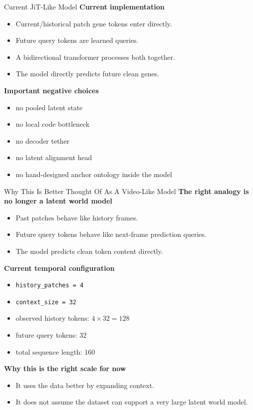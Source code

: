 \documentclass[aspectratio=169,11pt]{beamer}
\begin{document}
\begin{frame}{Current JiT-Like Model}
\textbf{Current implementation}
\begin{itemize}
    \item Current/historical patch gene tokens enter directly.
    \item Future query tokens are learned queries.
    \item A bidirectional transformer processes both together.
    \item The model directly predicts future clean genes.
\end{itemize}

\vspace{0.5em}
\textbf{Important negative choices}
\begin{itemize}
    \item no pooled latent state
    \item no local code bottleneck
    \item no decoder tether
    \item no latent alignment head
    \item no hand-designed anchor ontology inside the model
\end{itemize}
\end{frame}

\begin{frame}{Why This Is Better Thought Of As A Video-Like Model}
\textbf{The right analogy is no longer a latent world model}
\begin{itemize}
    \item Past patches behave like history frames.
    \item Future query tokens behave like next-frame prediction queries.
    \item The model predicts clean token content directly.
\end{itemize}

\vspace{0.5em}
\textbf{Current temporal configuration}
\begin{itemize}
    \item \texttt{history\_patches = 4}
    \item \texttt{context\_size = 32}
    \item observed history tokens: \(4 \times 32 = 128\)
    \item future query tokens: \(32\)
    \item total sequence length: \(160\)
\end{itemize}

\vspace{0.5em}
\textbf{Why this is the right scale for now}
\begin{itemize}
    \item It uses the data better by expanding context.
    \item It does not assume the dataset can support a very large latent world model.
\end{itemize}
\end{frame}
\end{document}
